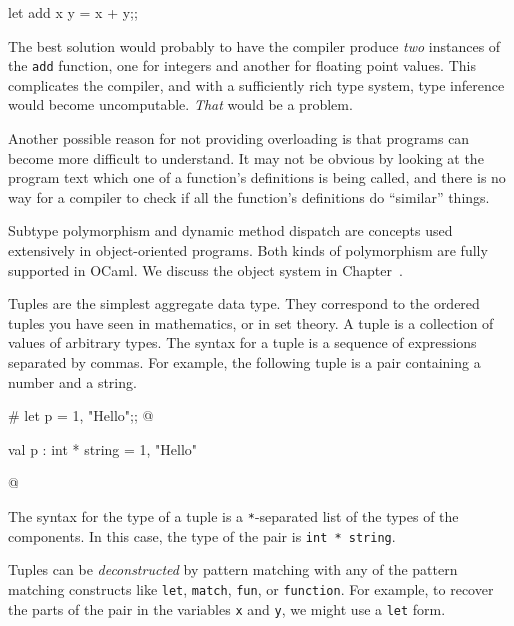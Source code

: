 \begin{ocaml}
let add x y = x + y;;
\end{ocaml}

The best solution would probably to have the compiler produce
\emph{two} instances of the \hbox{\hbox{\lstinline/add/}} function, one for integers and
another for floating point values.  This complicates the compiler, and
with a sufficiently rich type system, type inference would become
uncomputable.  \emph{That} would be a problem.

Another possible reason for not providing overloading is that programs can
become more difficult to understand.  It may not be obvious by
looking at the program text which one of a function's definitions
is being called, and there is no way for a compiler to check if all
the function's definitions do ``similar'' things.


Subtype polymorphism and dynamic method dispatch are concepts used extensively
in object-oriented programs.  Both kinds of polymorphism are fully supported in
OCaml.  We discuss the object system in Chapter~.


Tuples are the simplest aggregate data type.  They correspond to the
ordered tuples you have seen in mathematics, or in set theory.  A
tuple is a collection of values of arbitrary types.  The syntax for a
tuple is a sequence of expressions separated by commas.  For example,
the following tuple is a pair containing a number and a string.

\label{keyword:,}
\begin{ocaml}
# let p = 1, "Hello";;
@
\begin{topoutput}
val p : int * string = 1, "Hello"
\end{topoutput}
@
\end{ocaml}
%
The syntax for the type of a tuple is a \hbox{\hbox{\lstinline/*/}}-separated list of the
types of the components.  In this case, the type of the pair is
\hbox{\hbox{\lstinline/int * string/}}.

\label{patterns:tuples}
Tuples can be \emph{deconstructed} by pattern matching with any of
the pattern matching constructs like \hbox{\hbox{\lstinline/let/}}, \hbox{\lstinline/match/}, \hbox{\lstinline/fun/},
or \hbox{\hbox{\lstinline/function/}}.  For example, to recover the parts of the pair in
the variables \hbox{\hbox{\lstinline/x/}} and \hbox{\lstinline/y/}, we might use a \hbox{\lstinline/let/} form.

